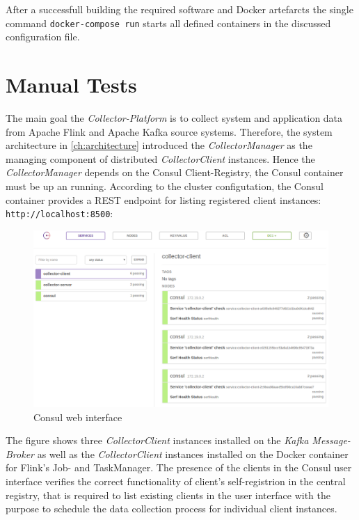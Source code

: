After a successfull building the required software and Docker artefarcts the single command \verb|docker-compose run| starts all
defined containers in the discussed configuration file.

\section{Manual Tests}

The main goal the \textit{Collector-Platform} is to collect system and application data from Apache Flink and Apache Kafka source systems.
Therefore, the system architecture in \autoref{ch:architecture} introduced the \textit{CollectorManager} as the managing component
of distributed \textit{CollectorClient} instances. Hence the \textit{CollectorManager} depends on the Consul Client-Registry,
the Consul container must be up an running. According to the cluster configutation, the Consul container provides a REST endpoint
for listing registered client instances:
\verb|http://localhost:8500|:
\begin{figure}[H]
	\centering
	\includegraphics[width=1.0\textwidth]{../images/08-consul.png}
	\caption{Consul web interface}
	\label{fig:consul-web}
\end{figure}

The figure shows three \textit{CollectorClient} instances installed on the \textit{Kafka Message-Broker} as well as the \textit{CollectorClient} instances installed
on the Docker container for Flink's Job- and TaskManager. The presence of the clients in the Consul user interface verifies the
correct functionality of client's self-registrion in the central registry, that is required to list existing clients in
the user interface with the purpose to schedule the data collection process for individual client instances.


